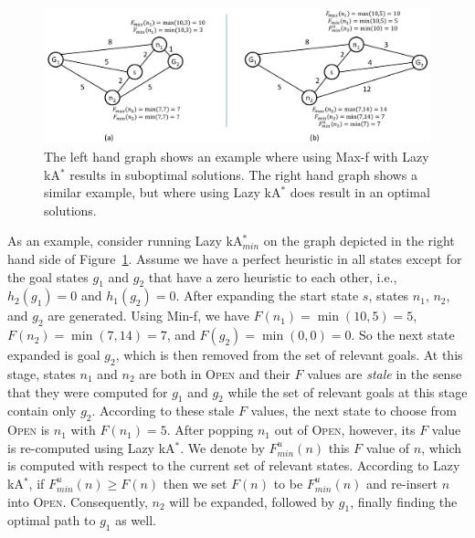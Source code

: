 \documentclass{aicom2e}
\newcommand{\kastar}{kA$^*$}
\newcommand{\kastarmin}{kA$^*_{min}$}
\newcommand{\minf}{Min-f}
\newcommand{\maxf}{Max-f}
\newcommand{\open}{\textsc{Open}}
\begin{document}
\begin{figure}
	\includegraphics[width=\textwidth]{Lazy_cropped.pdf}      
	\caption{The left hand graph shows an example where using \maxf{} with Lazy \kastar{} results in suboptimal solutions. The right hand graph shows a similar example, but where using Lazy \kastar{} does result in an optimal solutions.}
	\label{fig:lazy}
\end{figure}

As an example, consider running Lazy \kastarmin{} on the graph depicted in the right hand side of Figure~\ref{fig:lazy}. Assume we have a perfect heuristic in all states except for the goal states $g_1$ and $g_2$ that have a zero heuristic to each other, i.e., $h_2(g_1)=0$ and $h_1(g_2)=0$. After expanding the start state $s$, states $n_1$, $n_2$, and $g_2$ are generated. Using \minf{}, we have $F(n_1)=\min(10,5)=5$, $F(n_2)=\min(7,14)=7$, and $F(g_2)=\min(0,0)=0$. So the next state expanded is goal $g_2$, which is then removed from the set of relevant goals. At this stage, states $n_1$ and $n_2$ are both in \open{} and their $F$ values are {\em stale} in the sense that they were computed for $g_1$ and $g_2$ while the set of relevant goals at this stage contain only $g_2$. According to these stale $F$ values, the next state to choose from \open{} is $n_1$ with $F(n_1)=5$. After popping $n_1$ out of \open{}, however, its $F$ value is re-computed  using Lazy \kastar{}. We denote by $F^u_{min}(n)$ this $F$ value of $n$, which is computed with respect to the current set of relevant states. According to Lazy \kastar{}, if $F^u_{min}(n)\geq F(n)$ then we set $F(n)$ to be $F^u_{min}(n)$ and re-insert $n$ into \open{}. Consequently, $n_2$ will be expanded, followed by $g_1$, finally finding the optimal path to $g_1$ as well. 
\end{document}
